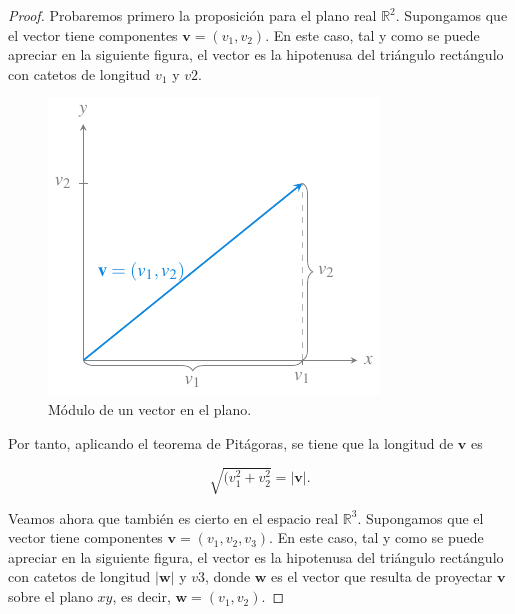 \documentclass[
  a4paper,
]{scrreport}
\theoremstyle{definition}
\theoremstyle{plain}
\theoremstyle{definition}
\theoremstyle{definition}
\theoremstyle{plain}
\theoremstyle{plain}
\theoremstyle{remark}
\begin{document}
\begin{tcolorbox}[enhanced jigsaw, leftrule=.75mm, colbacktitle=quarto-callout-note-color!10!white, toprule=.15mm, opacityback=0, opacitybacktitle=0.6, toptitle=1mm, breakable, bottomtitle=1mm, colframe=quarto-callout-note-color-frame, rightrule=.15mm, titlerule=0mm, title=\textcolor{quarto-callout-note-color}{\faInfo}\hspace{0.5em}{Demostración}, arc=.35mm, left=2mm, bottomrule=.15mm, colback=white, coltitle=black]

\begin{proof}
Probaremos primero la proposición para el plano real \(\mathbb{R}^2\).
Supongamos que el vector tiene componentes \(\mathbf{v}=(v_1,v_2)\). En
este caso, tal y como se puede apreciar en la siguiente figura, el
vector es la hipotenusa del triángulo rectángulo con catetos de longitud
\(v_1\) y \(v2\).

\begin{figure}[H]

{\centering \includegraphics{img/geometria-plano-espacio/modulo-vector-plano.pdf}

}

\caption{Módulo de un vector en el plano.}

\end{figure}%

Por tanto, aplicando el teorema de Pitágoras, se tiene que la longitud
de \(\mathbf{v}\) es

\[
\sqrt{(v_1^2+v_2^2} = |\mathbf{v}|.
\]

Veamos ahora que también es cierto en el espacio real \(\mathbb{R}^3\).
Supongamos que el vector tiene componentes \(\mathbf{v}=(v_1,v_2,v_3)\).
En este caso, tal y como se puede apreciar en la siguiente figura, el
vector es la hipotenusa del triángulo rectángulo con catetos de longitud
\(|\mathbf{w}|\) y \(v3\), donde \(\mathbf{w}\) es el vector que resulta
de proyectar \(\mathbf{v}\) sobre el plano \(xy\), es decir,
\(\mathbf{w}=(v_1,v_2)\).


\end{proof}
\end{tcolorbox}
\end{document}
